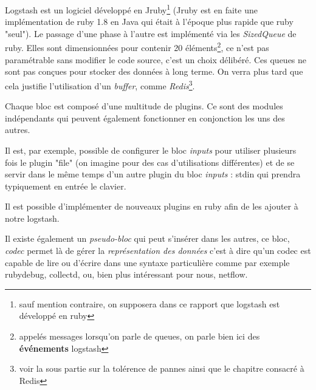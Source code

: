 Logstash est un logiciel développé en Jruby\footnote{sauf mention contraire, on supposera
dans ce rapport que logstash est développé en ruby} (Jruby est en faite une implémentation
de ruby 1.8 en Java qui était à l'époque plus rapide que ruby "seul"). 
Le passage d'une phase à l'autre est implémenté via les \emph{SizedQueue} de ruby. 
Elles sont dimensionnées pour contenir 20 éléments\footnote{appelés messages lorsqu'on parle de queues, on parle bien ici 
des \textbf{événements} logstash}, ce n'est pas paramétrable sans modifier le code 
source, c'est un choix délibéré. Ces queues ne sont pas conçues pour stocker des 
données à long terme. On verra plus tard que cela justifie l'utilisation d'un 
\textit{buffer}, comme \emph{Redis}\footnote{voir la sous partie sur la tolérence
de pannes ainsi que le chapitre consacré à Redis}.


Chaque bloc est composé d'une multitude de plugins. Ce sont des modules indépendants
qui peuvent également fonctionner en conjonction les uns des autres.

Il est, par exemple, possible de configurer le bloc \emph{inputs} pour utiliser 
plusieurs fois le plugin "file" (on imagine pour des cas d'utilisations différentes) 
et de se servir dans le même temps d'un autre plugin du bloc \emph{inputs} : stdin 
qui prendra typiquement en entrée le clavier.


Il est possible d'implémenter de nouveaux plugins en ruby afin de les ajouter à
notre logstash.

Il existe également un \textit{pseudo-bloc} qui peut s'insérer dans les autres, ce 
bloc, \emph{codec} permet là de gérer la \textit{représentation des données} c'est 
à dire qu'un codec est capable de lire ou d'écrire dans une syntaxe particulière 
comme par exemple rubydebug, collectd, ou, bien plus intéressant pour nous, netflow.





